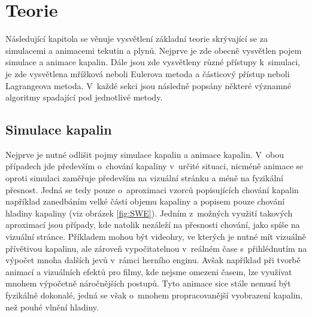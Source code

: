 \chapter{Teorie}
Následující kapitola se věnuje vysvětlení základní teorie skrývající se za simulacemi a animacemi tekutin a plynů. Nejprve je zde obecně vysvětlen pojem simulace a animace kapalin. Dále jsou zde vysvětleny různé přístupy k~simulaci, je zde vysvětlena mřížková neboli Eulerova metoda a částicový přístup neboli Lagrangeova metoda. V~každé sekci jsou následně popsány některé významné algoritmy spadající pod jednotlivé metody.

\label{chapter:teorie}
\section{Simulace kapalin}
Nejprve je nutné odlišit pojmy simulace kapalin a animace kapalin. V~obou případech jde především o~chování kapaliny v~určité situaci, nicméně animace se oproti simulaci zaměřuje především na vizuální stránku a méně na fyzikální přesnost. Jedná se tedy pouze o~aproximaci vzorců popisujících chování kapalin například zanedbáním velké části objemu kapaliny a popisem pouze chování hladiny kapaliny (viz obrázek \ref{fig:SWE}). Jedním z~možných využití takových aproximací jsou případy, kde natolik nezáleží na přesnosti chování, jako spíše na vizuální stránce. Příkladem mohou být videohry, ve kterých je nutné mít vizuálně přívětivou kapalinu, ale zároveň vypočitatelnou v~reálném čase s~přihlédnutím na výpočet mnoha dalších jevů v~rámci herního enginu. Avšak například při tvorbě animací a vizuálních efektů pro filmy, kde nejsme omezeni časem, lze využívat mnohem výpočetně náročnějších postupů. Tyto animace sice stále nemusí být fyzikálně dokonalé, jedná se však o~mnohem propracovanější vyobrazení kapalin, než pouhé vlnění hladiny. \cite{Medvecky-Heretik2018thesis}

